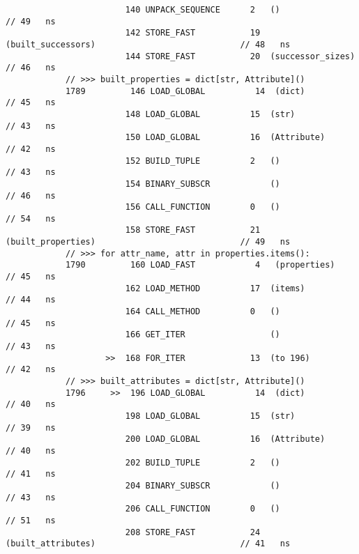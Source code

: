 \begin{code}
\begin{verbatim}
                        140 UNPACK_SEQUENCE      2   ()                                             // 49   ns
                        142 STORE_FAST           19  (built_successors)                             // 48   ns
                        144 STORE_FAST           20  (successor_sizes)                              // 46   ns
            // >>> built_properties = dict[str, Attribute]()
            1789         146 LOAD_GLOBAL          14  (dict)                                        // 45   ns
                        148 LOAD_GLOBAL          15  (str)                                          // 43   ns
                        150 LOAD_GLOBAL          16  (Attribute)                                    // 42   ns
                        152 BUILD_TUPLE          2   ()                                             // 43   ns
                        154 BINARY_SUBSCR            ()                                             // 46   ns
                        156 CALL_FUNCTION        0   ()                                             // 54   ns
                        158 STORE_FAST           21  (built_properties)                             // 49   ns
            // >>> for attr_name, attr in properties.items():
            1790         160 LOAD_FAST            4   (properties)                                  // 45   ns
                        162 LOAD_METHOD          17  (items)                                        // 44   ns
                        164 CALL_METHOD          0   ()                                             // 45   ns
                        166 GET_ITER                 ()                                             // 43   ns
                    >>  168 FOR_ITER             13  (to 196)                                       // 42   ns
            // >>> built_attributes = dict[str, Attribute]()
            1796     >>  196 LOAD_GLOBAL          14  (dict)                                        // 40   ns
                        198 LOAD_GLOBAL          15  (str)                                          // 39   ns
                        200 LOAD_GLOBAL          16  (Attribute)                                    // 40   ns
                        202 BUILD_TUPLE          2   ()                                             // 41   ns
                        204 BINARY_SUBSCR            ()                                             // 43   ns
                        206 CALL_FUNCTION        0   ()                                             // 51   ns
                        208 STORE_FAST           24  (built_attributes)                             // 41   ns

\end{verbatim}
\end{code}
